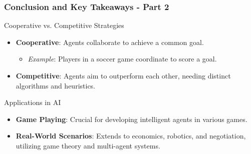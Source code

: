 \documentclass[aspectratio=169]{beamer}
\begin{document}
\begin{frame}[fragile]
  \frametitle{Conclusion and Key Takeaways - Part 2}
  \begin{block}{Cooperative vs. Competitive Strategies}
    \begin{itemize}
      \item \textbf{Cooperative}: Agents collaborate to achieve a common goal.
        \begin{itemize}
          \item \textit{Example}: Players in a soccer game coordinate to score a goal.
        \end{itemize}
        
      \item \textbf{Competitive}: Agents aim to outperform each other, needing distinct algorithms and heuristics.
    \end{itemize}

    \begin{block}{Applications in AI}
      \begin{itemize}
        \item \textbf{Game Playing}: Crucial for developing intelligent agents in various games.
        \item \textbf{Real-World Scenarios}: Extends to economics, robotics, and negotiation, utilizing game theory and multi-agent systems.
      \end{itemize}
    \end{block}
  \end{block}
\end{frame}
\end{document}
